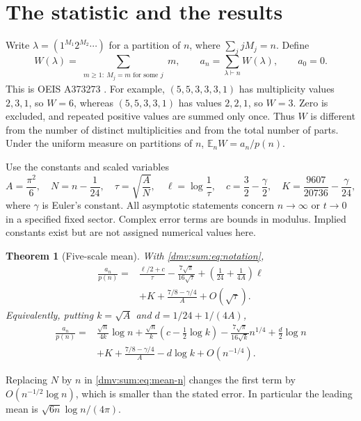 \documentclass[11pt,letterpaper]{article}
\numberwithin{equation}{section}
\newtheorem{theorem}{Theorem}[section]
\theoremstyle{definition}\newtheorem{definition}[theorem]{Definition}
\theoremstyle{remark}\newtheorem{remark}[theorem]{Remark}
\newcommand{\E}{\mathbb E}
\begin{document}
\section{The statistic and the results}\label{dmv:sum:sec:results}
Write $\lambda=(1^{M_1}2^{M_2}\cdots)$ for a partition of $n$, where $\sum_j jM_j=n$. Define
\begin{equation}\label{dmv:sum:eq:def}
 W(\lambda)=\sum_{\substack{m\ge1:\ M_j=m\text{ for some }j}}m,
 \qquad a_n=\sum_{\lambda\vdash n}W(\lambda),\qquad a_0=0.
\end{equation}
This is OEIS A373273 \cite{oeisA373273}. For example, $(5,5,3,3,3,1)$ has multiplicity values $2,3,1$, so $W=6$, whereas $(5,5,3,3,1)$ has values $2,2,1$, so $W=3$. Zero is excluded, and repeated positive values are summed only once. Thus $W$ is different from the number of distinct multiplicities and from the total number of parts. Under the uniform measure on partitions of $n$, $\E_nW=a_n/p(n)$.

Use the constants and scaled variables
\begin{equation}\label{dmv:sum:eq:notation}
 A=\frac{\pi^2}{6},\quad N=n-\frac1{24},\quad
 \tau=\sqrt{\frac A N},\quad \ell=\log\frac1\tau,
 \quad c=\frac32-\frac\gamma2,\quad K=\frac{9607}{20736}-\frac\gamma{24},
\end{equation}
where $\gamma$ is Euler's constant. All asymptotic statements concern $n\to\infty$ or $t\to0$ in a specified fixed sector. Complex error terms are bounds in modulus. Implied constants exist but are not assigned numerical values here.

\begin{theorem}[Five-scale mean]\label{dmv:sum:thm:mean}
With \eqref{dmv:sum:eq:notation},
\begin{equation}\label{dmv:sum:eq:mean}
\begin{split}
\frac{a_n}{p(n)}={}&\frac{\ell/2+c}{\tau}-\frac{7\sqrt\pi}{16\sqrt\tau}
 +\left(\frac1{24}+\frac1{4A}\right)\ell\\
 &+K+\frac{7/8-\gamma/4}{A}+O(\sqrt\tau).
\end{split}
\end{equation}
Equivalently, putting $k=\sqrt A$ and $d=1/24+1/(4A)$,
\begin{equation}\label{dmv:sum:eq:mean-n}
\begin{split}
\frac{a_n}{p(n)}={}&\frac{\sqrt n}{4k}\log n
 +\frac{\sqrt n}{k}\left(c-\frac12\log k\right)
 -\frac{7\sqrt\pi}{16\sqrt k}n^{1/4}+\frac d2\log n\\
 &+K+\frac{7/8-\gamma/4}{A}-d\log k+O(n^{-1/4}).
\end{split}
\end{equation}
\end{theorem}
Replacing $N$ by $n$ in \eqref{dmv:sum:eq:mean-n} changes the first term by $O(n^{-1/2}\log n)$, which is smaller than the stated error. In particular the leading mean is $\sqrt{6n}\log n/(4\pi)$.
\end{document}
